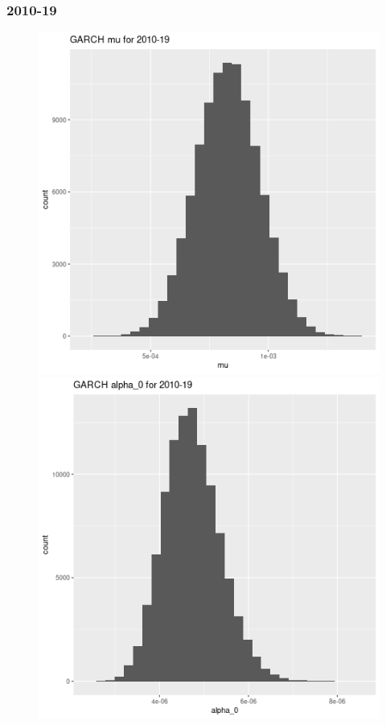 \documentclass[12pt,letterpaper,reqno,fleqn]{article}
\begin{document}
\subsubsection{2010-19}
\begin{figure}
\includegraphics[scale = .4]{gmu1019}
\includegraphics[scale = .4]{ga01019}

\end{figure}
\end{document}
